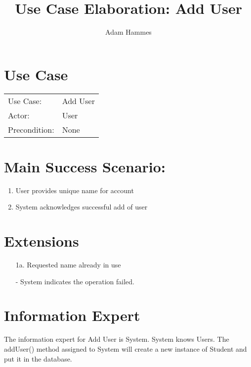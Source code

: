 \documentclass{article}
\title{Use Case Elaboration: Add User}
\author{Adam Hammes}
\begin{document}
\maketitle

\section*{Use Case}

\begin{tabular}{l l}
Use Case:     & Add User \\
Actor:        & User \\
Precondition: & None \\
\end{tabular}

\section*{Main Success Scenario:}

\begin{enumerate}
    \item User provides unique name for account
    \item System acknowledges successful add of user
\end{enumerate}

\section*{Extensions}

\begin{itemize}
    \item [1a.] Requested name already in use
     
    - System indicates the operation failed.
\end{itemize}

\section*{Information Expert}

The information expert for Add User is System.
System knows Users.
The addUser() method assigned to System will create a new instance of Student and put it in the database.

\pagebreak
\end{document}
